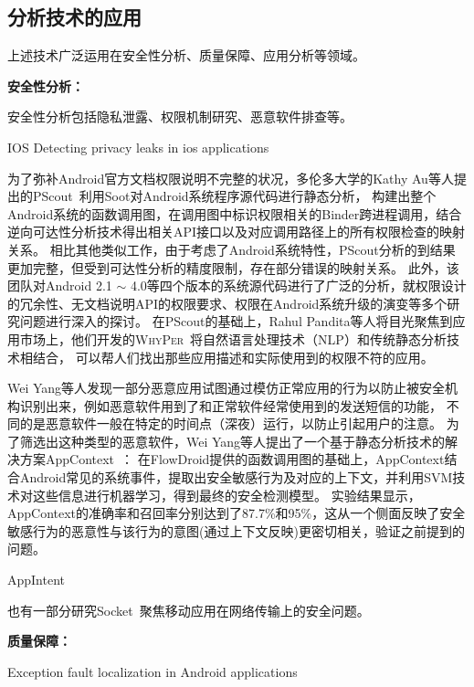 \subsection{分析技术的应用}

上述技术广泛运用在安全性分析、质量保障、应用分析等领域。

\textbf{安全性分析：}

安全性分析包括隐私泄露、权限机制研究、恶意软件排查等。

IOS Detecting privacy leaks in ios applications

为了弥补Android官方文档权限说明不完整的状况，多伦多大学的Kathy Au等人提出的PScout~\cite{au2012pscout}利用Soot对Android系统程序源代码进行静态分析，
构建出整个Android系统的函数调用图，在调用图中标识权限相关的Binder跨进程调用，结合逆向可达性分析技术得出相关API接口以及对应调用路径上的所有权限检查的映射关系。
相比其他类似工作，由于考虑了Android系统特性，PScout分析的到结果更加完整，但受到可达性分析的精度限制，存在部分错误的映射关系。
此外，该团队对Android 2.1 $\sim$  4.0等四个版本的系统源代码进行了广泛的分析，就权限设计的冗余性、无文档说明API的权限要求、权限在Android系统升级的演变等多个研究问题进行深入的探讨。
在PScout的基础上，Rahul Pandita等人将目光聚焦到应用市场上，他们开发的\textsc{WhyPer}~\cite{pandita2013whyper}将自然语言处理技术（NLP）和传统静态分析技术相结合，
可以帮人们找出那些应用描述和实际使用到的权限不符的应用。



Wei Yang等人发现一部分恶意应用试图通过模仿正常应用的行为以防止被安全机构识别出来，例如恶意软件用到了和正常软件经常使用到的发送短信的功能，
不同的是恶意软件一般在特定的时间点（深夜）运行，以防止引起用户的注意。
为了筛选出这种类型的恶意软件，Wei Yang等人提出了一个基于静态分析技术的解决方案AppContext~\cite{yang2015appcontext}：
在FlowDroid提供的函数调用图的基础上，AppContext结合Android常见的系统事件，提取出安全敏感行为及对应的上下文，并利用SVM技术对这些信息进行机器学习，得到最终的安全检测模型。
实验结果显示，AppContext的准确率和召回率分别达到了87.7\%和95\%，这从一个侧面反映了安全敏感行为的恶意性与该行为的意图(通过上下文反映)更密切相关，验证之前提到的问题。


AppIntent~\cite{yang2013appintent}

也有一部分研究Socket~\cite{Shao2016The,Jia2017Open,bu2017program}聚焦移动应用在网络传输上的安全问题。



\textbf{质量保障：}


Exception fault localization in Android applications~\cite{mirzaei2015exception}

